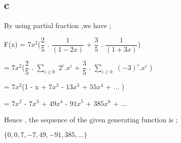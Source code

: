 \documentclass[12pt]{article}
\begin{document}
\subsection*{c}
\hspace{15px} By using partial fraction ,we have ; \par 
F(x) = \textit{$7x^2$}($\dfrac{2}{5}$ . $\dfrac{1}{(1-2x)}$ + $\dfrac{3}{5}  $ . $\dfrac{1}{(1+3x)}$) \\ \par 
\hspace{23px} = \textit{$7x^2$}($\dfrac{2}{5}$ . $\sum_{i\geq0}$ $\textit{$2^{i}$} . \textit{$x^{i}$}$ + $\dfrac{3}{5}$ . $\sum_{i\geq0}$ $\textit{$(-3)^{i}$} . \textit{$x^{i}$}$ ) \par 
\hspace{23px} = \textit{$7x^2$}(1 - x + \textit{$7x^2$} - \textit{$13x^3$} + \textit{$55x^4$}  + ... ) \par 
\hspace{23px} = \textit{$7x^2$} - \textit{$7x^3$} + \textit{$49x^4$} - \textit{$91x^5$} + \textit{$385x^6$} + ... \par 
Hence , the sequence of the given generating function is ; \par 
$\{0,0,7,-7,49,-91,385,...\}$
 
\end{document}
